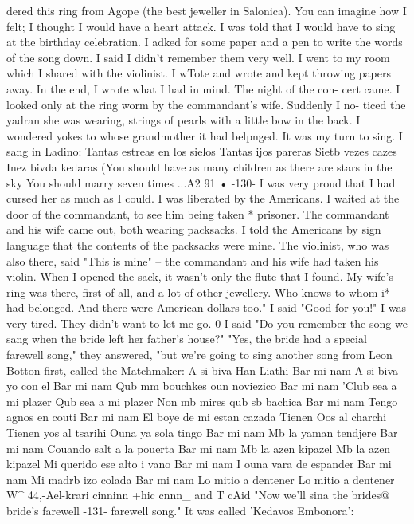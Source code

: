dered this ring from Agope (the best jeweller in Salonica). You can imagine how I 
felt; I thought I would have a heart attack. I was told that I would have to sing 
at the birthday celebration. I adked for some paper and a pen to write the words of 
the song down. I said I didn't remember them very well. 
I went to my room which I shared with the violinist. I wTote and wrote and kept 
throwing papers away. In the end, I wrote what I had in mind. The night of the con-
cert came. I looked only at the ring worm by the commandant's wife. Suddenly I no-
ticed the yadran she was wearing, strings of pearls with a little bow in the back. I 
wondered yokes to whose grandmother it had belpnged. It was my turn to sing. I sang 
in Ladino: 
Tantas estreas en los sielos 
Tantas ijos pareras 
Sietb vezes cazes 
Inez bivda kedaras 
(You should have as many children 
as there are stars in the sky 
You should marry seven times 
...A2 91 • 
-130- 
I was very proud that I had cursed her as much as I could. 
I was liberated by the Americans. I waited at the door of the commandant, to 
see him being taken 
* 
prisoner. The commandant and his wife came out, both wearing 
packsacks. I told the Americans by sign language that the contents of the packsacks 
were mine. The violinist, who was also there, said "This is mine" -- the commandant 
and his wife had taken his violin. When I opened the sack, it wasn't only the flute 
that I found. My wife's ring was there, first of all, and a lot of other jewellery. 
Who knows to whom i* had belonged. And there were American dollars too." 
I said "Good for you!" I was very tired. They didn't want to let me go. 0 I 
said "Do you remember the song we sang when the bride left her father's house?" 
"Yes, the bride had a special farewell song," they answered, "but we're going 
to sing another song from Leon Botton first, called the Matchmaker: 
A si biva Han Liathi 
Bar mi nam 
A si biva yo con el 
Bar mi nam 
Qub mm bouchkes oun noviezico 
Bar mi nam 
'Club sea a mi plazer 
Qub sea a mi plazer 
Non mb mires qub sb bachica 
Bar mi nam 
Tengo agnos en couti 
Bar mi nam 
El boye de mi estan cazada 
Tienen Oos al charchi 
Tienen yos al tsarihi 
Ouna ya sola tingo 
Bar mi nam 
Mb la yaman tendjere 
Bar mi nam 
Couando salt a la pouerta 
Bar mi nam 
Mb la azen kipazel 
Mb la azen kipazel 
Mi querido ese alto i vano 
Bar mi nam 
I ouna vara de espander 
Bar mi nam 
Mi madrb izo colada 
Bar mi nam 
Lo mitio a dentener 
Lo mitio a dentener 
W^ 44,-Ael-krari cinninn +hic cnnn_ and T cAid "Now we'll sina the brides@ bride's farewell 
-131- 
farewell song." It was called 'Kedavos Embonora': 
